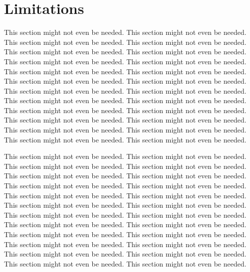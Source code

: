 
\section{Limitations}
\label{chpIntro-secLimitations}

This section might not even be needed. This section might not even be needed. This section might not even be needed.
This section might not even be needed. This section might not even be needed. This section might not even be needed.
This section might not even be needed. This section might not even be needed. This section might not even be needed.
This section might not even be needed. This section might not even be needed. This section might not even be needed.
This section might not even be needed. This section might not even be needed. This section might not even be needed.
This section might not even be needed. This section might not even be needed. This section might not even be needed.
This section might not even be needed. This section might not even be needed. This section might not even be needed.
This section might not even be needed. This section might not even be needed. This section might not even be needed.

This section might not even be needed. This section might not even be needed. This section might not even be needed.
This section might not even be needed. This section might not even be needed. This section might not even be needed.
This section might not even be needed. This section might not even be needed. This section might not even be needed.
This section might not even be needed. This section might not even be needed. This section might not even be needed.
This section might not even be needed. This section might not even be needed. This section might not even be needed.
This section might not even be needed. This section might not even be needed. This section might not even be needed.
This section might not even be needed. This section might not even be needed. This section might not even be needed.
This section might not even be needed. This section might not even be needed. This section might not even be needed.

